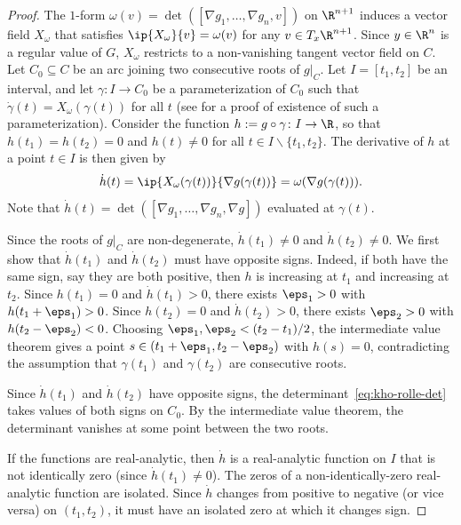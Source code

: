 \begin{proof}
The $1$-form $\omega(v) = \det([\nabla g_1, \ldots, \nabla g_n, v])$ on $\R^{n+1}$ induces a vector field $X_{\omega}$ that satisfies $\ip{X_{\omega}}{v} = \omega(v)$ for any $v \in T_{x}\R^{n+1}$. Since $y \in \R^n$ is a regular value of $G$, $X_{\omega}$ restricts to a non-vanishing tangent vector field on $C$.
Let $C_0 \subseteq C$ be an arc joining two consecutive roots of $g|_C$. Let $I=[t_1,t_2]$ be an interval, and let $\gamma : I \rightarrow C_0$ be a parameterization of $C_0$ such that $\dot{\gamma}(t) = X_{\omega}(\gamma(t))$ for all $t$ (see \cite[Chapter 14]{tu2011manifolds} for a proof of existence of such a parameterization). Consider the function $h := g \circ \gamma\colon I \rightarrow \R$, so that $h(t_1) = h(t_2) = 0$ and $h(t)\neq 0$ for all $t\in I\backslash \{t_1, t_2\}$.
The derivative of $h$ at a point $t \in I$ is then given by
\begin{equation*}
  \dot{h}(t) = \ip{X_{\omega}(\gamma(t))}{\nabla g(\gamma(t))} = \omega(\nabla g(\gamma(t))).
\end{equation*}
Note that $\dot{h}(t) = \det([\nabla g_1, \ldots, \nabla g_n, \nabla g])$ evaluated at $\gamma(t)$.

Since the roots of $g|_C$ are non-degenerate, $\dot{h}(t_1) \neq 0$ and $\dot{h}(t_2) \neq 0$. We first show that $\dot{h}(t_1)$ and $\dot{h}(t_2)$ must have opposite signs. Indeed, if both have the same sign, say they are both positive, then $h$ is increasing at $t_1$ and increasing at $t_2$. Since $h(t_1) = 0$ and $\dot{h}(t_1) > 0$, there exists $\eps_1 > 0$ with $h(t_1 + \eps_1) > 0$. Since $h(t_2) = 0$ and $\dot{h}(t_2) > 0$, there exists $\eps_2 > 0$ with $h(t_2 - \eps_2) < 0$. Choosing $\eps_1, \eps_2 < (t_2-t_1)/2$, the intermediate value theorem gives a point $s\in (t_1+\eps_1, t_2-\eps_2)$ with $h(s) = 0$, contradicting the assumption that $\gamma(t_1)$ and $\gamma(t_2)$ are consecutive roots.

Since $\dot{h}(t_1)$ and $\dot{h}(t_2)$ have opposite signs, the determinant~\eqref{eq:kho-rolle-det} takes values of both signs on $C_0$. By the intermediate value theorem, the determinant vanishes at some point between the two roots.

If the functions are real-analytic, then $\dot{h}$ is a real-analytic function on $I$ that is not identically zero (since $\dot{h}(t_1)\neq 0$). The zeros of a non-identically-zero real-analytic function are isolated. Since $\dot{h}$ changes from positive to negative (or vice versa) on $(t_1, t_2)$, it must have an isolated zero at which it changes sign.
\end{proof}

